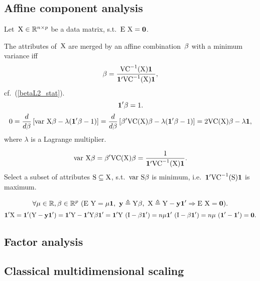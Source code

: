 \documentclass[10pt,a4paper]{article}
\theoremstyle{plain} \newtheorem{Lem}{Lemma}
\begin{document}
\subsection{Affine component analysis}

Let~$\mathrm X \in \mathbb R^{n \times p}$ be a data matrix, 
s.t.~$\mathrm E \  \mathrm X = \mathbf 0$.

The attributes of~$\mathrm X$ are merged by an affine combination~$\mathbf \beta$ with a minimum variance iff
$$ \mathbf \beta = \frac {\mathrm {VC}^{-1}(\mathrm X) \mathbf 1} {\mathbf 1' \mathrm {VC}^{-1}(\mathrm X) \mathbf 1}, $$
cf.~(\ref{betaL2_stat}).
$$ \mathbf 1' \mathbf \beta = 1. $$
\proof
{
$$ 0 = \frac d {d \mathbf \beta} \left[ \mathrm {var} \  \mathrm X \mathbf \beta - \lambda (\mathbf 1' \beta - 1) \right]
     = \frac d {d \mathbf \beta} \left[ \mathbf \beta' \mathrm {VC}(\mathrm X) \mathbf \beta - \lambda (\mathbf 1' \beta - 1) \right]
     = 2 \mathrm {VC}(\mathrm X) \mathbf \beta - \lambda \mathbf 1, $$
where $\lambda$ is a Lagrange multiplier.
}

$$ \mathrm {var} \  \mathrm X \mathbf \beta = \mathbf \beta' \mathrm {VC}(\mathrm X) \mathbf \beta = \frac 1 {\mathbf 1' \mathrm {VC}^{-1}(\mathrm X) \mathbf 1}. $$
\comm 
{Select a subset of attributes $\mathrm S \subseteq \mathrm X$, s.t.~$\mathrm {var} \  \mathrm S \mathbf \beta$ is minimum,
    i.e.~$\mathbf 1' \mathrm {VC}^{-1}(\mathrm S) \mathbf 1$ is maximum. 
}

$$ \forall \mu \in \mathbb R, \mathbf \beta \in \mathbb R^p \
  (\mathrm E \  \mathrm Y = \mu \mathbf 1, \ \mathbf y \triangleq \mathrm Y \mathbf \beta, \ \mathrm X \triangleq \mathrm Y - \mathbf y \mathbf 1' \Rightarrow \mathrm E \  {\mathrm X} = \mathbf 0). 
$$
\proof
{
    $$ \mathbf 1' \mathrm X = \mathbf 1' (\mathrm Y - \mathbf y \mathbf 1') 
    = \mathbf 1' \mathrm Y - \mathbf 1' \mathrm Y \mathbf \beta \mathbf 1'
    = \mathbf 1' \mathrm Y \ (\mathrm I - \mathbf \beta \mathbf 1')
    = n \mu \mathbf 1' \ (\mathrm I - \mathbf \beta \mathbf 1')
    = n \mu \ (\mathbf 1' - \mathbf 1')
    = \mathbf 0.
    $$
}





\subsection {Factor analysis}
\comm{}


\subsection {Classical multidimensional scaling}
\end{document}
